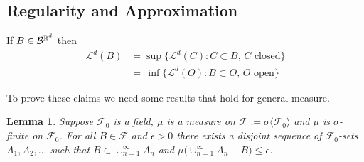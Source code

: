 \documentclass[10pt,letterpaper,twocolumn]{article}
\newtheorem{lemma}{Lemma}
\begin{document}
\subsection{Regularity and Approximation}

If $B\in\mathcal B^{\Bbb R^d}$  then
\begin{align*}
\mathcal L^d(B)  &= \sup \{ \mathcal L^d(C):  C\subset B,\, \text{$C$ closed}\}\\
  &=\, \inf \{ \mathcal L^d(O):  B\subset O,\, \text{$O$ open}\}
\end{align*}



To prove these claims we need some results that hold for general measure.


\begin{lemma}
\label{l1}
 Suppose  $\mathcal F_0$ is a field, $\mu$ is a measure on $\mathcal F:=\sigma\langle \mathcal F_0\rangle$ and $\mu$ is $\sigma$-finite on $\mathcal F_0$. For all $B\in \mathcal F$ and $\epsilon>0$ there exists a disjoint sequence of $\mathcal F_0$-sets $A_1, A_2,\ldots$ such that $B\subset \cup_{n=1}^\infty A_n$ and $ \mu\bigl( \cup_{n=1}^\infty A_n -
 B\bigr)\leq \epsilon$.
\end{lemma}
\end{document}
